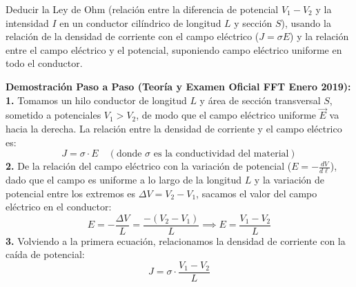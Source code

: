 \begin{ejercicio}
Deducir la Ley de Ohm (relación entre la diferencia de potencial $V_1 - V_2$ y la intensidad $I$ en un conductor cilíndrico de longitud $L$ y sección $S$), usando la relación de la densidad de corriente con el campo eléctrico ($J = \sigma E$) y la relación entre el campo eléctrico y el potencial, suponiendo campo eléctrico uniforme en todo el conductor.
\tcbline
\begin{center}
\end{center}
\textbf{Demostración Paso a Paso (Teoría y Examen Oficial FFT Enero 2019):}\\[4pt]
\textbf{1.} Tomamos un hilo conductor de longitud $L$ y área de sección transversal $S$, sometido a potenciales $V_1 > V_2$, de modo que el campo eléctrico uniforme $\vec{E}$ va hacia la derecha. La relación entre la densidad de corriente y el campo eléctrico es:
\begin{equation}
    J = \sigma \cdot E \quad (\text{donde }\sigma\text{ es la conductividad del material})
\end{equation}
\textbf{2.} De la relación del campo eléctrico con la variación de potencial ($E = -\frac{dV}{d\ell}$), dado que el campo es uniforme a lo largo de la longitud $L$ y la variación de potencial entre los extremos es $\Delta V = V_2 - V_1$, sacamos el valor del campo eléctrico en el conductor:
\begin{equation}
    E = -\frac{\Delta V}{L} = \frac{-(V_2 - V_1)}{L} \implies E = \frac{V_1 - V_2}{L}
\end{equation}
\textbf{3.} Volviendo a la primera ecuación, relacionamos la densidad de corriente con la caída de potencial:
\begin{equation}
    J = \sigma \cdot \frac{V_1 - V_2}{L}
\end{equation}

\end{ejercicio}
